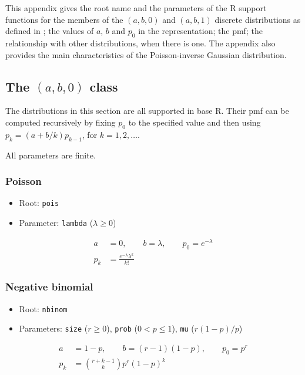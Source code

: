 \documentclass[x11names]{article}
\newcommand{\proglang}[1]{\textsf{#1}}
\newcommand{\code}[1]{\texttt{#1}}
\begin{document}
This appendix gives the root name and the parameters of the
\proglang{R} support functions for the members of the $(a, b, 0)$ and
$(a, b, 1)$ discrete distributions as defined in \cite{LossModels4e};
the values of $a$, $b$ and $p_0$ in the representation; the pmf; the
relationship with other distributions, when there is one. The appendix
also provides the main characteristics of the Poisson-inverse Gaussian
distribution.

\subsection[The (a, b, 0) class]{The $(a, b, 0)$ class}
\label{sec:app:discrete:a-b-0}

The distributions in this section are all supported in base
\proglang{R}. Their pmf can be computed recursively by fixing $p_0$ to
the specified value and then using $p_k = (a + b/k) p_{k - 1}$, for
$k = 1, 2, \dots$.

All parameters are finite.

\subsubsection{Poisson}

\begin{itemize}
\item Root: \code{pois}
\item Parameter: \code{lambda} ($\lambda \geq 0$)
\end{itemize}
\begin{align*}
  a &= 0, \qquad b = \lambda, \qquad p_0 = e^{-\lambda} \\
  p_k &= \frac{e^{-\lambda} \lambda^k}{k!}
\end{align*}

\subsubsection{Negative binomial}

\begin{itemize}
\item Root: \code{nbinom}
\item Parameters: \code{size} ($r \geq 0$),
  \code{prob} ($0 < p \leq 1$),
  \code{mu} ($r(1 - p)/p$)
\end{itemize}
\begin{align*}
  a &= 1 - p, \qquad b = (r - 1)(1 - p), \qquad p_0 = p^r \\
  p_k &= \binom{r+k-1}{k} p^r (1 - p)^k
\end{align*}
\end{document}
